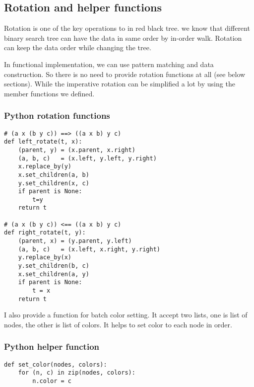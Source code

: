 \documentclass{article}
\begin{document}
\subsection{Rotation and helper functions} \label{helper-fun}

Rotation is one of the key operations to in red black tree. we know that
different binary search tree can have the data in same order by in-order walk.
Rotation can keep the data order while changing the tree. 

In functional implementation, we can use pattern matching and data construction.
So there is no need to provide rotation functions at all (see below sections).
While the imperative rotation can be simplified a lot by using the member functions we defined.

\subsubsection*{Python rotation functions}
\lstset{language=Python}
\begin{lstlisting}
# (a x (b y c)) ==> ((a x b) y c)
def left_rotate(t, x):
    (parent, y) = (x.parent, x.right)
    (a, b, c)   = (x.left, y.left, y.right)
    x.replace_by(y)
    x.set_children(a, b)
    y.set_children(x, c)
    if parent is None:
        t=y
    return t

# (a x (b y c)) <== ((a x b) y c)
def right_rotate(t, y):
    (parent, x) = (y.parent, y.left)
    (a, b, c)   = (x.left, x.right, y.right)
    y.replace_by(x)
    y.set_children(b, c)
    x.set_children(a, y)
    if parent is None:
        t = x
    return t
\end{lstlisting}

I also provide a function for batch color setting. It accept two lists,
one is list of nodes, the other is list of colors. It helps to set color
to each node in order.

\subsubsection*{Python helper function}
\lstset{language=Python}
\begin{lstlisting}
def set_color(nodes, colors):
    for (n, c) in zip(nodes, colors):
        n.color = c
\end{lstlisting}
\end{document}
